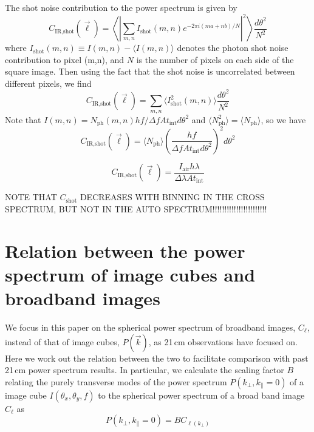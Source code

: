 \documentclass{emulateapj}
\newcommand{\IR}{\text{IR}}
\newcommand{\shot}{\text{shot}}
\begin{document}
The shot noise contribution to the power spectrum is given by
\begin{equation}
C_{\IR, \shot}(\vec{\ell}) = \left\langle\left|\sum_{m,n}I_\shot(m,n)e^{-2\pi i(ma+nb)/N}\right|^2\right\rangle \frac{d\theta^2}{N^2}
\end{equation}
where $I_\shot(m,n)\equiv I(m,n)-\langle I(m,n)\rangle$ denotes the photon shot noise contribution to pixel (m,n), and $N$ is the number of pixels on each side of the square image. Then using the fact that the shot noise is uncorrelated between different pixels, we find
\begin{equation}
C_{\IR, \shot}(\vec{\ell}) = \sum_{m,n}\langle I^2_\shot(m,n)\rangle \frac{d\theta^2}{N^2}
\end{equation}
Note that $I(m,n)=N_\text{ph}(m,n)hf/\Delta f A t_\text{int}d\theta^2$ and $\langle N_\text{ph}^2\rangle = \langle N_\text{ph}\rangle$, so we have
\begin{equation}
C_{\IR, \shot}(\vec{\ell}) = \langle N_\text{ph}\rangle \left(\frac{hf}{\Delta f A t_\text{int}d\theta^2}\right)^2 d\theta^2
\end{equation}

\begin{equation}
C_{\IR, \shot}(\vec{\ell}) =\frac{I_\text{air}h\lambda}{\Delta \lambda A t_\text{int}}
\end{equation}

NOTE THAT $C_\shot$ DECREASES WITH BINNING IN THE CROSS SPECTRUM, BUT NOT IN THE AUTO SPECTRUM!!!!!!!!!!!!!!!!!!!!!!!

\section{Relation between the power spectrum of image cubes and broadband images}
\label{sec:pspecrelation}

We focus in this paper on the spherical power spectrum of broadband images, $C_\ell$,  instead of that of image cubes, $P(\vec{k})$, as 21\,cm observations have focused on. Here we work out the relation between the two to facilitate comparison with past 21\,cm power spectrum results. In particular, we calculate the scaling factor $B$ relating the purely transverse modes of the power spectrum $P(k_\perp,k_\parallel=0)$ of a image cube $I(\theta_x,\theta_y,f)$ to the spherical power spectrum of a broad band image $C_\ell$ as
\begin{equation}
P(k_\perp,k_\parallel=0) = B C_{\ell(k_\perp)}
\end{equation}
\end{document}
